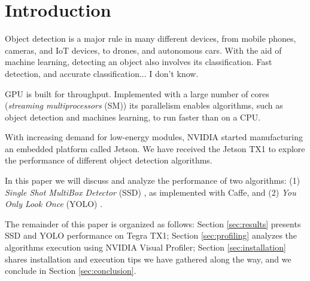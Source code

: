 \section{Introduction}
\label{sec:intro}

Object detection is a major rule in many different devices, from mobile phones, cameras, and IoT devices, to drones, and autonomous cars. With the aid of machine learning, detecting an object also involves its classification. Fast detection, and accurate classification... I don't know.

GPU is built for throughput. Implemented with a large number of cores (\textit{streaming multiprocessors} (SM)) its parallelism enables algorithms, such as object detection and machines learning, to run faster than on a CPU.

With increasing demand for low-energy modules, NVIDIA started manufacturing an embedded platform called Jetson. We have received the Jetson TX1 to explore the performance of different object detection algorithms.

In this paper we will discuss and analyze the performance of two algorithms: (1) \textit{Single Shot MultiBox Detector} (SSD) \cite{liu2016ssd}, as implemented with Caffe, and (2) \textit{You Only Look Once} (YOLO) \cite{redmon2016you}.

The remainder of this paper is organized as follows: Section \ref{sec:results} presents SSD and YOLO performance on Tegra TX1; Section \ref{sec:profiling} analyzes the algorithms execution using NVIDIA Visual Profiler; Section \ref{sec:installation} shares installation and execution tips we have gathered along the way, and we conclude in Section \ref{sec:conclusion}.

